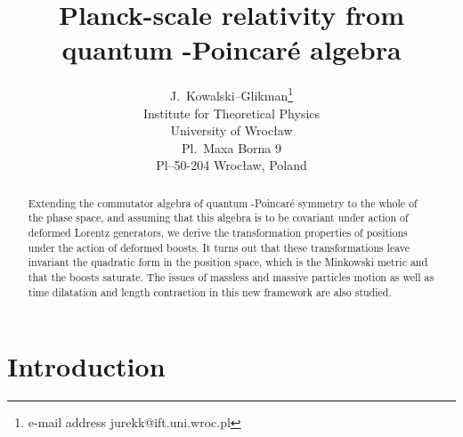 \documentclass[a4paper,a4paper]{article}
\begin{document}
\title{%
Planck-scale relativity from quantum \myHighlight{$\kappa$}\coordHE{}-Poincar\'e algebra}
\author{ J.\ Kowalski--Glikman\thanks{e-mail
address jurekk@ift.uni.wroc.pl}\\ Institute for Theoretical
Physics\\ University of Wroc\l{}aw\\ Pl.\ Maxa Borna 9\\
Pl--50-204 Wroc\l{}aw, Poland} \maketitle

\begin{abstract}
Extending the commutator algebra of quantum \myHighlight{$\kappa$}\coordHE{}-Poincar\'e symmetry to the whole of the phase space, and assuming that this algebra is to be covariant under action of deformed Lorentz generators, we derive the transformation properties of positions under the action of deformed boosts. It turns out that these transformations leave invariant the quadratic form in the position space, which is the Minkowski metric and that the boosts saturate. The issues of massless and massive particles motion as well as time dilatation and length contraction in this new framework are also studied.
\end{abstract}
\clearpage

\section{Introduction}
\end{document}
